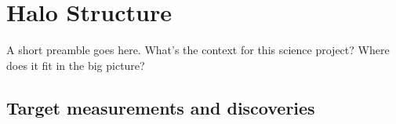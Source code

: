 %
%
%
%
%
%
%
%

\section{Halo Structure}
\def\secname{halostructure}\label{sec:\secname} %



A short preamble goes here. What's the context for this science
project? Where does it fit in the big picture?



\subsection{Target measurements and discoveries}
\label{sec:keyword:targets}

